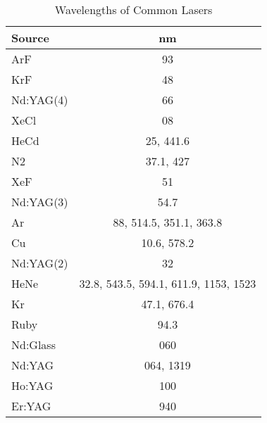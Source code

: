 \newpage
\begin{table}
    \caption{Wavelengths of Common Lasers}
    \label{tab:common_lasers}
    \begin{center}
	\begin{tabular}{l|c}
	    \hline
	    Source	& nm	\\
	    \hline
	    ArF	& 93	\\
	    \hline
	    KrF	& 48	\\
	    \hline
	    Nd:YAG(4)	& 66	\\
	    \hline
	    XeCl	& 08	\\
	    \hline
	    HeCd	& 25, 441.6	\\
	    \hline
	    N2	& 37.1, 427	\\
	    \hline
	    XeF	& 51	\\
	    \hline
	    Nd:YAG(3)	& 54.7	\\
	    \hline
	    Ar	& 88, 514.5, 351.1, 363.8	\\
	    \hline
	    Cu	& 10.6, 578.2	\\
	    \hline
	    Nd:YAG(2)	& 32	\\
	    \hline
	    HeNe	& 32.8, 543.5, 594.1, 611.9, 1153, 1523	\\
	    \hline
	    Kr	& 47.1, 676.4	\\
	    \hline
	    Ruby	& 94.3	\\
	    \hline
	    Nd:Glass	& 060	\\
	    \hline
	    Nd:YAG	& 064, 1319	\\
	    \hline
	    Ho:YAG	& 100	\\
	    \hline
	    Er:YAG	& 940	\\
	    \hline
	\end{tabular}
    \end{center}
\end{table}

\renewcommand{\arraystretch}{1}

